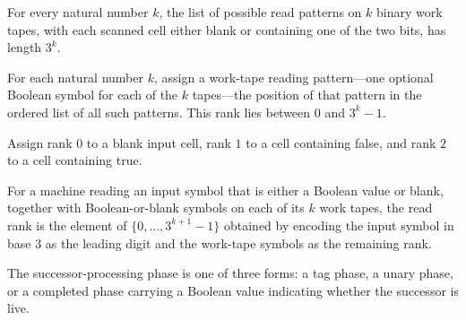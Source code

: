 \begin{lemma}
\label{Turing.StepBlock.length_workReadsK}
\leanok
{}
For every natural number $k$, the list of possible read patterns on $k$ binary work
tapes, with each scanned cell either blank or containing one of the two bits, has length
$3^k$.
\end{lemma}

\begin{definition}
\label{Turing.StepBlock.workRank}
\leanok
{}
For each natural number $k$, assign a work-tape reading pattern—one optional Boolean
symbol for each of the $k$ tapes—the position of that pattern in the ordered list of all
such patterns. This rank lies between $0$ and $3^k-1$.
\end{definition}

\begin{definition}
\label{Turing.StepBlock.inputRank}
\leanok
Assign rank $0$ to a blank input cell, rank $1$ to a cell containing false, and rank $2$
to a cell containing true.
\end{definition}

\begin{definition}
\label{Turing.StepBlock.readRank}
\leanok
{}
For a machine reading an input symbol that is either a Boolean value or blank, together
with Boolean-or-blank symbols on each of its $k$ work tapes, the read rank is the
element of $\{0,\ldots,3^{k+1}-1\}$ obtained by encoding the input symbol in base $3$ as
the leading digit and the work-tape symbols as the remaining rank.
\end{definition}

\begin{definition}
\label{Turing.StepBlock.SuccPhase}
\leanok
The successor-processing phase is one of three forms: a tag phase, a unary phase, or a
completed phase carrying a Boolean value indicating whether the successor is live.
\end{definition}

